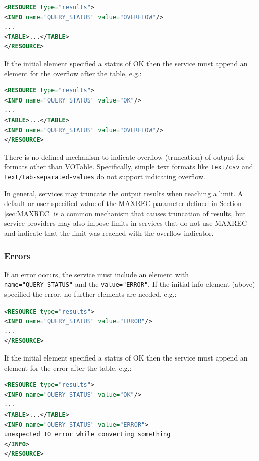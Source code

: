 \documentclass[11pt,letter]{ivoa}
\begin{document}
\begin{lstlisting}[language=XML]
<RESOURCE type="results">
<INFO name="QUERY_STATUS" value="OVERFLOW"/>
...
<TABLE>...</TABLE>
</RESOURCE>
\end{lstlisting}

If the initial  element specified a status of OK then the service must
append an  element for the overflow after the table, e.g.:

\begin{lstlisting}[language=XML]
<RESOURCE type="results">
<INFO name="QUERY_STATUS" value="OK"/>
...
<TABLE>...</TABLE>
<INFO name="QUERY_STATUS" value="OVERFLOW"/>
</RESOURCE>
\end{lstlisting}

There is no defined mechanism to indicate overflow (truncation) of output for formats
other than VOTable. Specifically, simple text formats like \verb|text/csv| and
\verb|text/tab-separated-values| do not support indicating overflow.

In general, services may truncate the output results when reaching a limit. A default or
user-specified value of the MAXREC parameter defined in Section \ref{sec:MAXREC}
is a common mechanism that causes truncation
of results, but service providers may also impose limits in services that do not use
MAXREC and indicate that the limit was reached with the overflow indicator.


\subsubsection{Errors}
\label{sect:errors}

If an error occurs, the service must include an  element with
\verb|name="QUERY_STATUS"| and the \verb|value="ERROR"|. If the initial info element (above)
specified the error, no further elements are needed, e.g.:

\begin{lstlisting}[language=XML]
<RESOURCE type="results">
<INFO name="QUERY_STATUS" value="ERROR"/>
...
</RESOURCE>
\end{lstlisting}

If the initial  element specified a status of OK then the service must
append an  element for the error after the table, e.g.:

\begin{lstlisting}[language=XML]
<RESOURCE type="results">
<INFO name="QUERY_STATUS" value="OK"/>
...
<TABLE>...</TABLE>
<INFO name="QUERY_STATUS" value="ERROR">
unexpected IO error while converting something
</INFO>
</RESOURCE>
\end{lstlisting}
\end{document}
